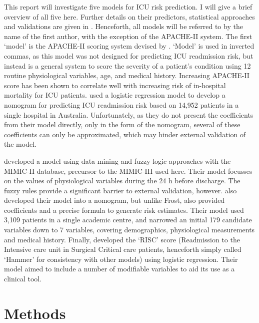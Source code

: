 \documentclass[onecolumn]{article}
\begin{document}
This report will investigate five models for ICU risk prediction. I will give a brief overview of all five here. Further details on their predictors, statistical approaches and validations are given in . Henceforth, all models will be referred to by the name of the first author, with the exception of the APACHE-II system.
The first `model' is the APACHE-II scoring system devised by \cite{Knaus1985}. `Model' is used in inverted commas, as this model was not designed for predicting ICU readmission risk, but instead is a general system to score the severity of a patient's condition using 12 routine physiological variables, age, and medical history. Increasing APACHE-II score has been shown to correlate well with increasing risk of in-hospital mortality for ICU patients. 
\cite{Frost2010} used a logistic regression model to develop a nomogram for predicting ICU readmission risk based on 14,952 patients in a single hospital in Australia. Unfortunately, as they do not present the coefficients from their model directly, only in the form of the nomogram, several of these coefficients can only be approximated, which may hinder external validation of the model.

\cite{Fialho2012} developed a model using data mining and fuzzy logic approaches with the MIMIC-II database, precursor to the MIMIC-III used here. Their model focusses on the values of physiological variables during the 24 h before discharge. The fuzzy rules provide a significant barrier to external validation, however.
\cite{Martin2018} also developed their model into a nomogram, but unlike Frost, also provided coefficients and a precise formula to generate risk estimates. Their model used 3,109 patients in a single academic centre, and narrowed an initial 179 candidate variables down to 7 variables, covering demographics, physiological measurements and medical history.
Finally, \cite{Hammer2020} developed the `RISC' score (Readmission to the
Intensive care unit in Surgical Critical care patients, henceforth simply called `Hammer' for consistency with other models) using logistic regression. Their model aimed to include a number of modifiable variables to aid its use as a clinical tool.

\section{Methods}
\end{document}
